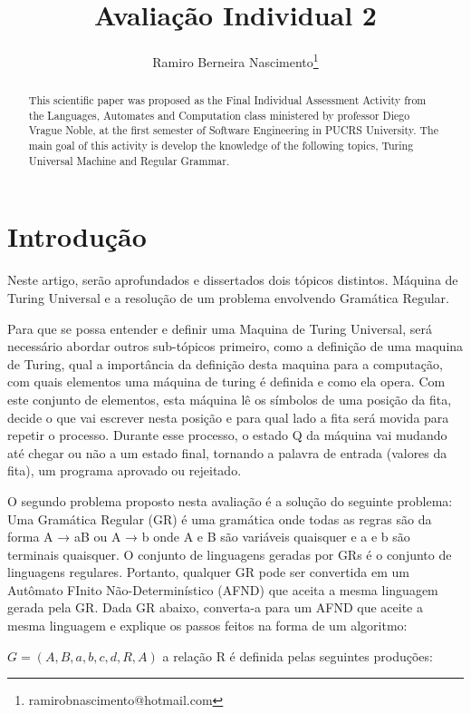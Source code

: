 \documentclass{article}
\title{Avaliação Individual 2}
\author{Ramiro Berneira Nascimento\thanks{ramirobnascimento@hotmail.com}}
\begin{document}
\maketitle

\begin{abstract}
This scientific paper was proposed as the Final Individual Assessment Activity from the Languages, Automates and Computation class ministered by professor Diego Vrague Noble, at the first semester of Software Engineering in PUCRS University. The main goal of this activity is develop the knowledge of the following topics, Turing Universal Machine and Regular Grammar.  
\end{abstract}

\section{Introdução}

    Neste artigo, serão aprofundados e dissertados dois tópicos distintos. Máquina de Turing Universal e a resolução de um problema envolvendo Gramática Regular.  
    
    Para que se possa entender e definir uma Maquina de Turing Universal, será necessário abordar outros sub-tópicos primeiro, como a definição de uma maquina de Turing, qual a importância da definição desta maquina para a computação, com quais elementos uma máquina de turing é definida e como ela opera. Com este conjunto de elementos, esta máquina lê os símbolos de uma posição da fita, decide o que vai escrever nesta posição e para qual lado a fita será movida para repetir o processo. Durante esse processo, o estado Q da máquina vai mudando até chegar ou não a um estado final, tornando a palavra de entrada (valores da fita), um programa aprovado ou rejeitado.
    
    O segundo problema proposto nesta avaliação é a solução do seguinte problema:
    Uma Gramática Regular (GR) é uma gramática onde todas as regras são da forma A → aB ou A → b onde A e B são variáveis quaisquer e a e b são terminais quaisquer. O conjunto de linguagens geradas por GRs é o conjunto de linguagens regulares. Portanto, qualquer GR pode ser convertida em um Autômato FInito Não-Determinístico (AFND) que aceita a  mesma linguagem gerada pela GR. Dada GR abaixo, converta-a para um AFND que aceite a mesma linguagem e explique os passos feitos na forma de um algoritmo:
    
    $G = ({A,B}, {a,b,c,d}, R, A)$ a relação R é definida pelas seguintes produções:
    
\end{document}
